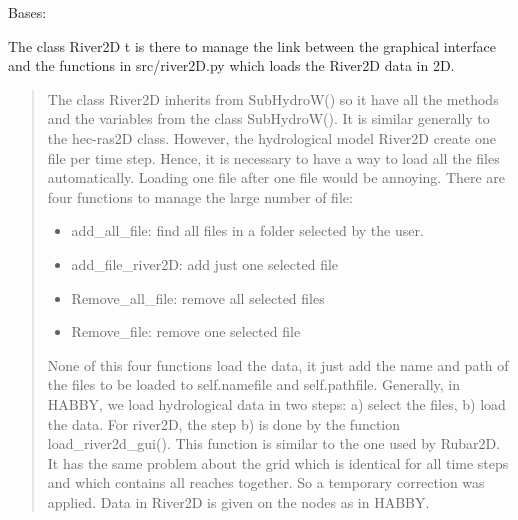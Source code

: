 \documentclass[letterpaper,10pt,english]{sphinxmanual}
\begin{document}

\begin{fulllineitems}
\label{\detokenize{index:src_GUI.hydro_GUI_2.River2D}}
Bases: {\hyperref[\detokenize{index:src_GUI.hydro_GUI_2.SubHydroW}]{}}

The class River2D t is there to manage the link between the graphical interface and the functions in src/river2D.py
which loads the River2D data in 2D.

\begin{quote}

The class River2D inherits from SubHydroW() so it have all the methods and the variables from the class SubHydroW().
It is similar generally to the hec-ras2D class. However, the hydrological model River2D create one file per time step.
Hence, it is necessary to have a way to load all the files automatically. Loading one file after one file would be
annoying. There are four functions to manage the large number of file:
\begin{itemize}
\item {} 
add\_all\_file: find all files in a folder selected by the user.

\item {} 
add\_file\_river2D: add just one selected file

\item {} 
Remove\_all\_file: remove all selected files

\item {} 
Remove\_file: remove one selected file

\end{itemize}

None of this four functions load the data, it just add the name and path of the files to be loaded to
self.namefile and self.pathfile. Generally, in HABBY, we load hydrological data in two steps: a) select the files,
b) load the data. For river2D, the step b) is done by the function load\_river2d\_gui().
This function is similar to the one used by Rubar2D. It has the same problem about the grid which
is identical for all time steps and which contains all reaches together. So a temporary correction was applied.
Data in River2D is given on the nodes as in HABBY.
\end{quote}


\end{fulllineitems}
\end{document}
